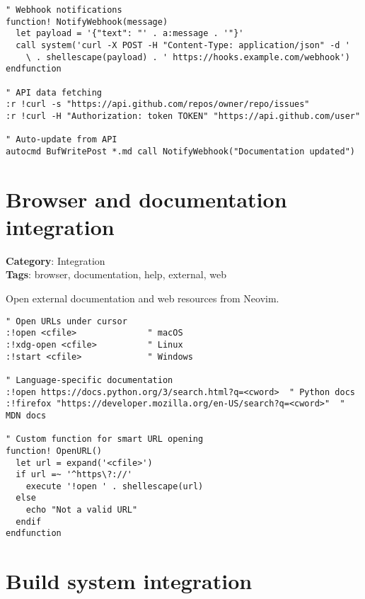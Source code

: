 {{{{{{\begin{Exa*}{}
\begin{Verbatim}[fontsize=\footnotesize, breaklines, breakanywhere]
" Webhook notifications
function! NotifyWebhook(message)
  let payload = '{"text": "' . a:message . '"}'
  call system('curl -X POST -H "Content-Type: application/json" -d ' 
    \ . shellescape(payload) . ' https://hooks.example.com/webhook')
endfunction

" API data fetching
:r !curl -s "https://api.github.com/repos/owner/repo/issues"
:r !curl -H "Authorization: token TOKEN" "https://api.github.com/user"

" Auto-update from API
autocmd BufWritePost *.md call NotifyWebhook("Documentation updated")
\end{Verbatim}
\end{Exa*}

\section{Browser and documentation integration}

\textbf{Category}: Integration\\ \textbf{Tags}: browser, documentation, help, external, web
\vspace{0.5cm}

Open external documentation and web resources from Neovim.

\begin{Exa*}{}
\begin{Verbatim}[fontsize=\footnotesize, breaklines, breakanywhere]
" Open URLs under cursor
:!open <cfile>              " macOS
:!xdg-open <cfile>          " Linux
:!start <cfile>             " Windows

" Language-specific documentation
:!open https://docs.python.org/3/search.html?q=<cword>  " Python docs
:!firefox "https://developer.mozilla.org/en-US/search?q=<cword>"  " MDN docs

" Custom function for smart URL opening
function! OpenURL()
  let url = expand('<cfile>')
  if url =~ '^https\?://'
    execute '!open ' . shellescape(url)
  else
    echo "Not a valid URL"
  endif
endfunction
\end{Verbatim}
\end{Exa*}

\section{Build system integration}

}}}}}}
